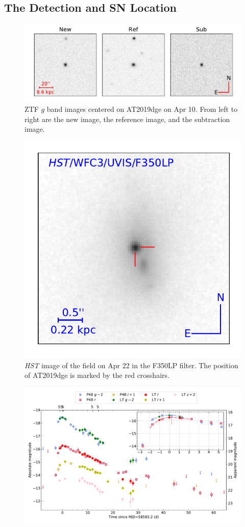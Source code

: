 \documentclass[twocolumn]{aastex63}
\begin{document}
\begin{CJK*}{UTF8}{gbsn}
\subsection{The Detection and SN Location}
\begin{figure}[htbp!]
    \centering
    \includegraphics[width=\columnwidth]{figures/detection.pdf}
    \caption{ZTF $g$ band images centered on AT2019dge on Apr 10. From left to right are the new 
    image, the reference image, and the subtraction image. \ \label{fig:detection}}
\end{figure}
\begin{figure}
	\centering
	\includegraphics[width=0.6\columnwidth]{figures/offset.pdf}
	\caption{\textit{HST} image of the field on Apr 22 in the F350LP filter. The position of AT2019dge is 
	marked by the red crosshairs.
		\label{fig:offset}}
\end{figure}
\begin{figure}[htbp!]
	\centering
	\includegraphics[width=\textwidth]{figures/lightcurve.pdf}

\end{figure}
\end{CJK*}
\end{document}

